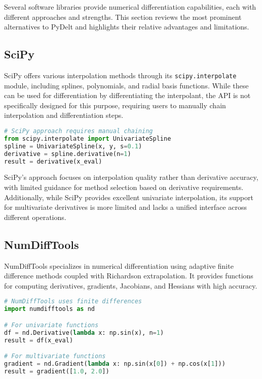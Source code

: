 \documentclass[11pt,a4paper]{article}
\begin{document}
Several software libraries provide numerical differentiation capabilities, each with different approaches and strengths. This section reviews the most prominent alternatives to PyDelt and highlights their relative advantages and limitations.

\subsection{SciPy}

SciPy \citep{virtanen2020scipy} offers various interpolation methods through its \texttt{scipy.interpolate} module, including splines, polynomials, and radial basis functions. While these can be used for differentiation by differentiating the interpolant, the API is not specifically designed for this purpose, requiring users to manually chain interpolation and differentiation steps.

\begin{lstlisting}[language=Python, caption=SciPy differentiation example]
# SciPy approach requires manual chaining
from scipy.interpolate import UnivariateSpline
spline = UnivariateSpline(x, y, s=0.1)
derivative = spline.derivative(n=1)
result = derivative(x_eval)
\end{lstlisting}

SciPy's approach focuses on interpolation quality rather than derivative accuracy, with limited guidance for method selection based on derivative requirements. Additionally, while SciPy provides excellent univariate interpolation, its support for multivariate derivatives is more limited and lacks a unified interface across different operations.

\subsection{NumDiffTools}

NumDiffTools \citep{numdifftools} specializes in numerical differentiation using adaptive finite difference methods coupled with Richardson extrapolation. It provides functions for computing derivatives, gradients, Jacobians, and Hessians with high accuracy.

\begin{lstlisting}[language=Python, caption=NumDiffTools example]
# NumDiffTools uses finite differences
import numdifftools as nd

# For univariate functions
df = nd.Derivative(lambda x: np.sin(x), n=1)
result = df(x_eval)

# For multivariate functions
gradient = nd.Gradient(lambda x: np.sin(x[0]) + np.cos(x[1]))
result = gradient([1.0, 2.0])
\end{lstlisting}
\end{document}
